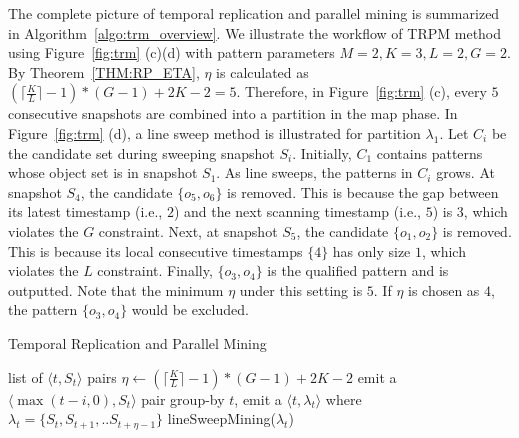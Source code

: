 The complete picture of temporal replication and parallel mining is summarized in Algorithm~\ref{algo:trm_overview}. We illustrate the workflow of TRPM method using Figure~\ref{fig:trm} (c)(d) with pattern
parameters $M=2, K=3, L = 2, G=2$. By Theorem~\ref{THM:RP_ETA}, $\eta$ is calculated
as $(\lceil \frac{K}{L} \rceil-1) *(G-1)+2K - 2 = 5$. Therefore, 
in Figure~\ref{fig:trm} (c), every $5$ consecutive snapshots are combined 
into a partition in the map phase. In Figure~\ref{fig:trm} (d), a line sweep
method is illustrated for partition $\lambda_1$. Let $C_i$ be the candidate set
during sweeping snapshot $S_i$.
Initially, $C_1$ contains patterns whose object set is in snapshot $S_1$.
As line sweeps, the patterns in $C_i$ grows. At snapshot $S_4$, the candidate
$\{o_5,o_6\}$ is removed. This is because the gap between its latest timestamp (i.e., $2$)
and the next scanning timestamp (i.e., $5$) is $3$, which violates the $G$ constraint.
Next, at snapshot $S_5$, the candidate $\{o_1,o_2\}$ is removed. This is
because its local consecutive timestamps $\{4\}$ has only size $1$,
which violates the $L$ constraint.
Finally, $\{o_3,o_4\}$ is the qualified pattern and is outputted. Note that the minimum $\eta$
under this setting is $5$. If $\eta$ is chosen as $4$, the pattern $\{o_3,o_4\}$ would be excluded. 

\begin{algorithm}
\caption{Temporal Replication and Parallel Mining}
\label{algo:trm_overview}
\begin{algorithmic}[1]
\Require list of $\langle t, S_t \rangle$ pairs
\State $\eta \gets (\lceil \frac{K}{L} \rceil -1)*(G-1)+2K-2$
\label{code:trm-map-start}
		\State emit a $\langle \max(t-i,0), S_t \rangle$ pair
	\EndFor  
\EndFor
\label{code:trm-map-end}
\label{code:trm-par-start}
\State group-by $t$, emit a $\langle t, \lambda_t\rangle$
\State where $\lambda_t = \{S_t, S_{t+1}, .. S_{t+\eta-1}\} $
\EndFor
\label{code:trm-par-end}
\label{code:trm-red-start}
\State lineSweepMining($\lambda_t$)
\label{code:trm-red-end}
\EndFor
\end{algorithmic}
\end{algorithm}